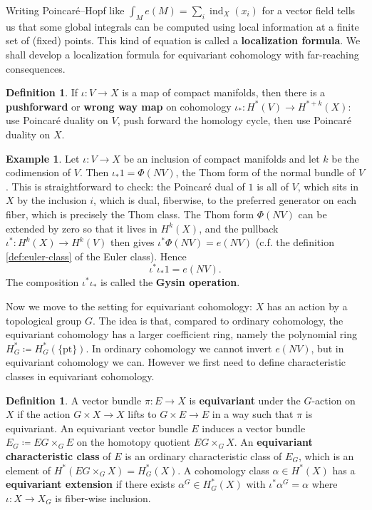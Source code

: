 \documentclass{report}
\theoremstyle{plain}
\theoremstyle{definition}
\newtheorem{definition}[theorem]{Definition}
\newtheorem{example}[theorem]{Example}
\theoremstyle{remark}
\DeclareMathOperator{\ind}{ind}
\newcommand{\pt}{\mathrm{pt}}
\begin{document}
Writing Poincar\'e--Hopf like $\int_M e(M) = \sum_i \ind_X(x_i)$ for a
vector field tells us that some global integrals can be computed using
local information at a finite set of (fixed) points. This kind of
equation is called a {\bf localization formula}. We shall develop a
localization formula for equivariant cohomology with far-reaching
consequences.

\begin{definition}
  If $\iota\colon V \to X$ is a map of compact manifolds, then there
  is a {\bf pushforward} or {\bf wrong way map} on cohomology
  $\iota_*\colon H^*(V) \to H^{*+k}(X)$: use Poincar\'e duality on
  $V$, push forward the homology cycle, then use Poincar\'e duality on
  $X$.
\end{definition}

\begin{example}
  Let $\iota\colon V \to X$ be an inclusion of compact manifolds and
  let $k$ be the codimension of $V$. Then $\iota_*1 = \Phi(NV)$, the
  Thom form of the normal bundle of $V$. This is straightforward to
  check: the Poincar\'e dual of $1$ is all of $V$, which sits in $X$
  by the inclusion $i$, which is dual, fiberwise, to the preferred
  generator on each fiber, which is precisely the Thom class. The Thom
  form $\Phi(NV)$ can be extended by zero so that it lives in
  $H^k(X)$, and the pullback $\iota^*\colon H^k(X) \to H^k(V)$ then
  gives $\iota^*\Phi(NV) = e(NV)$ (c.f. the definition
  \ref{def:euler-class} of the Euler class). Hence
  \[ \iota^* \iota_* 1 = e(NV). \]
  The composition $\iota^*\iota_*$ is called the {\bf Gysin operation}.
\end{example}

Now we move to the setting for equivariant cohomology: $X$ has an
action by a topological group $G$. The idea is that, compared to
ordinary cohomology, the equivariant cohomology has a larger
coefficient ring, namely the polynomial ring $H^*_G \coloneqq
H^*_G(\{\pt\})$. In ordinary cohomology we cannot invert $e(NV)$, but
in equivariant cohomology we can. However we first need to define
characteristic classes in equivariant cohomology.

\begin{definition}
  A vector bundle $\pi\colon E \to X$ is {\bf equivariant} under the
  $G$-action on $X$ if the action $G \times X \to X$ lifts to $G
  \times E \to E$ in a way such that $\pi$ is equivariant. An
  equivariant vector bundle $E$ induces a vector bundle $E_G \coloneqq
  EG \times_G E$ on the homotopy quotient $EG \times_G X$. An {\bf
    equivariant characteristic class} of $E$ is an ordinary
  characteristic class of $E_G$, which is an element of $H^*(EG
  \times_G X) = H^*_G(X)$. A cohomology class $\alpha \in H^*(X)$ has
  a {\bf equivariant extension} if there exists $\alpha^G \in
  H^*_G(X)$ with $\iota^*\alpha^G = \alpha$ where $\iota\colon X \to
  X_G$ is fiber-wise inclusion.
\end{definition}
\end{document}
